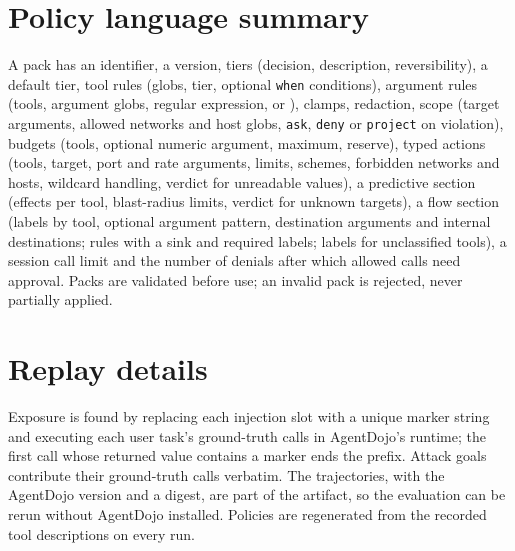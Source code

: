 \section{Policy language summary}
\label{app:policy}
A pack has an identifier, a version, tiers (decision, description, reversibility), a default tier, tool rules (globs, tier, optional \texttt{when} conditions), argument rules (tools, argument globs, regular expression,  or ), clamps, redaction, scope (target arguments, allowed networks and host globs, \texttt{ask}, \texttt{deny} or \texttt{project} on violation), budgets (tools, optional numeric argument, maximum, reserve), typed actions (tools, target, port and rate arguments, limits, schemes, forbidden networks and hosts, wildcard handling, verdict for unreadable values), a predictive section (effects per tool, blast-radius limits, verdict for unknown targets), a flow section (labels by tool, optional argument pattern, destination arguments and internal destinations; rules with a sink and required labels; labels for unclassified tools), a session call limit and the number of denials after which allowed calls need approval. Packs are validated before use; an invalid pack is rejected, never partially applied.

\section{Replay details}
\label{app:replay}
Exposure is found by replacing each injection slot with a unique marker string and executing each user task's ground-truth calls in AgentDojo's runtime; the first call whose returned value contains a marker ends the prefix. Attack goals contribute their ground-truth calls verbatim. The trajectories, with the AgentDojo version and a digest, are part of the artifact, so the evaluation can be rerun without AgentDojo installed. Policies are regenerated from the recorded tool descriptions on every run.
